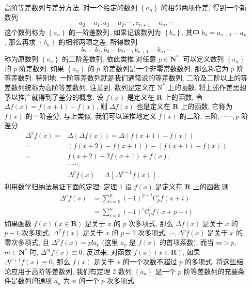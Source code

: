 
高阶等差数列与差分方法.
对一个给定的数列 $\left\{a_n\right\}$ 的相邻两项作差, 得到一个新数列
$$
a_2-a_1, a_3-a_2, \cdots, a_{n+1}-a_n, \cdots
$$
这个数列称为 $\left\{a_n\right\}$ 的一阶差数列.
如果记该数列为 $\left\{b_n\right\}$, 其中 $b_n=a_{n+1}-a_n$, 那么再求 $\left\{b_n\right\}$ 的相邻两项之差, 所得数列
$$
b_2-b_1, b_3-b_2, \cdots, b_{n+1}-b_n, \cdots
$$
称为原数列 $\left\{a_n\right\}$ 的二阶差数列.
依此类推,对任意 $p \in \mathbf{N}^*$, 可以定义数列 $\left\{a_n\right\}$ 的 $p$ 阶差数列.
如果 $\left\{a_n\right\}$ 的 $p$ 阶差数列是一个非零常数数列, 那么称它为 $p$ 阶等差数列.
特别地, 一阶等差数列就是我们通常说的等差数列, 二阶及二阶以上的等差数列统称为高阶等差数列.
注意到, 数列是定义在 $\mathrm{N}^*$ 上的函数, 将上述作差思想予以推广就得到了差分的概念.
设 $f(x)$ 是定义在 $\mathbf{R}$ 上的函数, 令 $\Delta f(x)=f(x+1)-f(x)$, 则 $\Delta f(x)$ 也是定义在 $\mathbf{R}$ 上的函数, 它称为 $f(x)$ 的一阶差分, 与上类似, 我们可以递推地定义 $f(x)$ 的二阶, 三阶, $\cdots \cdots, p$ 阶差分
$$
\begin{aligned}
\Delta^2 f(x)= & \Delta(\Delta f(x))=\Delta(f(x+1)-f(x)) \\
= & (f(x+2)-f(x+1))-(f(x+1)-f(x)) \\
= & f(x+2)-2 f(x+1)+f(x), \\
& \cdots \cdots, \\
& \Delta^p f(x)=\Delta\left(\Delta^{p-1} f(x)\right) .
\end{aligned}
$$
利用数学归纳法易证下面的定理:
定理 1 设 $f(x)$ 是定义在 $\mathbf{R}$ 上的函数,则
$$
\begin{aligned}
\Delta^p f(x) & =\sum_{i=0}^p(-1)^{p-i} \mathrm{C}_p^i f(x+i) \\
& =\sum_{i=0}^p(-1)^i \mathrm{C}_p^i f(x+p-i)
\end{aligned}
$$
如果函数 $f(x)(x \in \mathbf{R})$ 是关于 $x$ 的 $p$ 次多项式, 那么 $\Delta f(x)$ 是关于 $x$ 的 $p-1$ 次多项式, $\Delta^2 f(x)$ 是关于 $x$ 的 $p-2$ 次多项式, $\cdots, \Delta^p f(x)$ 是关于 $x$ 的零次多项式, 且 $\Delta^p f(x)=p ! a_p$ (这里 $a_p$ 是 $f(x)$ 的首项系数), 而当 $m>p$, $m \in \mathbf{N}^*$ 时, $\Delta^m f(x) \equiv 0$.
反过来, 对函数 $f(x)(x \in \mathbf{R})$, 如果 $\Delta^{p+1} f(x) \equiv 0$, 那么 $f(x)$ 是关于 $x$ 的一个次数不超过 $p$ 的多项式.
将这些结论应用于高阶等差数列, 我们有定理 2 数列 $\left\{a_n\right\}$ 是一个 $p$ 阶等差数列的充要条件是数列的通项 $a_n$ 为 $n$ 的一个 $p$ 次多项式.



